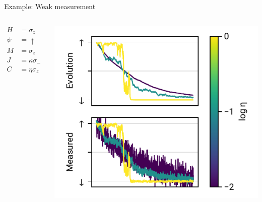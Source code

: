 \documentclass[
]{beamer}
\begin{document}
\begin{frame}{Example: Weak measurement}
	\begin{columns}
		\begin{align*}
			H &= \sigma_z\\
			\psi &= \uparrow\\
			M &= \sigma_z\\
			J &= \kappa\sigma_-\\
			C &= \eta \sigma_z
		\end{align*}


		\centering
		\includegraphics{figures/06 sme.pdf}
	\end{columns}
\end{frame}
\end{document}
